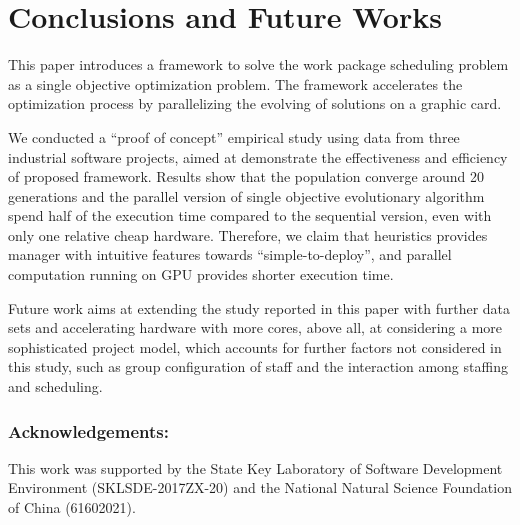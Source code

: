 %
%

\section{Conclusions and Future Works}
%
This paper introduces a framework to solve the work package scheduling problem as a single objective optimization problem. The framework accelerates the optimization process by parallelizing the evolving of solutions on a graphic card. 

We conducted a ``proof of concept'' empirical study using data from three industrial software projects, aimed at demonstrate the effectiveness and efficiency of proposed framework.
Results show that the population converge around 20 generations and the parallel version of single objective evolutionary algorithm spend half of the execution time compared to the sequential version, even with only one relative cheap hardware. 
Therefore, we claim that heuristics provides manager with intuitive features towards ``simple-to-deploy'', and parallel computation running on GPU provides shorter execution time.

Future work aims at extending the study reported in this paper with further data sets and accelerating hardware with more cores, above all, at considering a more sophisticated project model, which accounts for further factors not considered in this study, such as group configuration of staff and the interaction among staffing and scheduling.

\subsubsection{\small{Acknowledgements:}} \small{This work was supported by the State Key Laboratory of Software Development Environment (SKLSDE-2017ZX-20) and the National Natural Science Foundation of China (61602021).}

